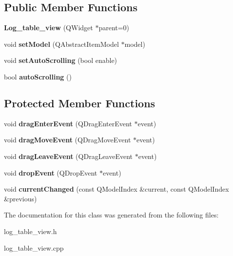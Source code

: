 \subsection*{Public Member Functions}
\begin{DoxyCompactItemize}
\item 
\hypertarget{class_log__table__view_a68302857c6f515f9153f6d31398d6afd}{{\bfseries Log\-\_\-table\-\_\-view} (Q\-Widget $\ast$parent=0)}\label{class_log__table__view_a68302857c6f515f9153f6d31398d6afd}

\item 
\hypertarget{class_log__table__view_aefec5bdac7b0b9e0f8f8e93bfa6dec84}{void {\bfseries set\-Model} (Q\-Abstract\-Item\-Model $\ast$model)}\label{class_log__table__view_aefec5bdac7b0b9e0f8f8e93bfa6dec84}

\item 
\hypertarget{class_log__table__view_a70b87261b61a438170e5d902926a4c38}{void {\bfseries set\-Auto\-Scrolling} (bool enable)}\label{class_log__table__view_a70b87261b61a438170e5d902926a4c38}

\item 
\hypertarget{class_log__table__view_a513c602f0f6b9b3781d9f9ec2b0b3c15}{bool {\bfseries auto\-Scrolling} ()}\label{class_log__table__view_a513c602f0f6b9b3781d9f9ec2b0b3c15}

\end{DoxyCompactItemize}
\subsection*{Protected Member Functions}
\begin{DoxyCompactItemize}
\item 
\hypertarget{class_log__table__view_a1526150b50bdf49505c9d9652ac2947d}{void {\bfseries drag\-Enter\-Event} (Q\-Drag\-Enter\-Event $\ast$event)}\label{class_log__table__view_a1526150b50bdf49505c9d9652ac2947d}

\item 
\hypertarget{class_log__table__view_a9d378da78bcfa9cfc5e124d47a340e73}{void {\bfseries drag\-Move\-Event} (Q\-Drag\-Move\-Event $\ast$event)}\label{class_log__table__view_a9d378da78bcfa9cfc5e124d47a340e73}

\item 
\hypertarget{class_log__table__view_ae98dec66199e645f9022c1925543bf8f}{void {\bfseries drag\-Leave\-Event} (Q\-Drag\-Leave\-Event $\ast$event)}\label{class_log__table__view_ae98dec66199e645f9022c1925543bf8f}

\item 
\hypertarget{class_log__table__view_a6ad378c737e744cb5517ae3932190d78}{void {\bfseries drop\-Event} (Q\-Drop\-Event $\ast$event)}\label{class_log__table__view_a6ad378c737e744cb5517ae3932190d78}

\item 
\hypertarget{class_log__table__view_adcb2fff0ead391c99f19bc9eb7ae96a0}{void {\bfseries current\-Changed} (const Q\-Model\-Index \&current, const Q\-Model\-Index \&previous)}\label{class_log__table__view_adcb2fff0ead391c99f19bc9eb7ae96a0}

\end{DoxyCompactItemize}


The documentation for this class was generated from the following files\-:\begin{DoxyCompactItemize}
\item 
log\-\_\-table\-\_\-view.\-h\item 
log\-\_\-table\-\_\-view.\-cpp\end{DoxyCompactItemize}
